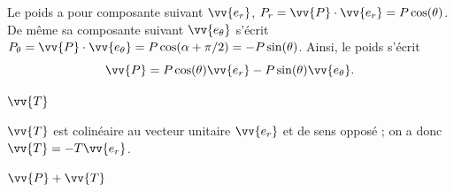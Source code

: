 
\begin{corrige}
Le poids a pour composante suivant $\vv{e_r}$, $P_r=\vv{P} \cdot \vv{e_r}=P\cos(\theta)$. De même sa composante suivant $\vv{e_\theta}$ s'écrit $P_\theta=\vv{P}\cdot \vv{e_\theta}=P\cos(\alpha+\pi/2)=-P\sin(\theta)$. Ainsi, le poids s'écrit 
\[
\vv{P} = P \cos(\theta)\vv{e_r} - P \sin (\theta) \vv{e_\theta}.
\]
 \end{corrige}


\begin{enonce}
	$\vv{T}$
\end{enonce}


\begin{corrige}
$\vv{T}$ est colinéaire au vecteur unitaire $\vv{e_r}$ et de sens opposé ; on a donc $\vv{T} =-T \vv{e_r}$.
\end{corrige}


\begin{enonce}
	$\vv{P}+\vv{T}$
\end{enonce}




\finEntrainement






\hauteurLargeurCadreReponse		{7mm}{4.75cm}
\initialisationEntrainement

